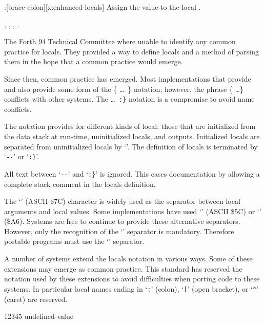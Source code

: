 \begin{worddef*}[b:]{}{\brace:}[brace-colon][x:enhanced-locals]
	Assign the value  to the local .

\see {},
	,
	,
	.

	\begin{rationale}
		The Forth 94 Technical Committee where unable to identify any common
		practice for locals.  They provided a way to define locals and a method
		of parsing them in the hope that a common practice would emerge.

		Since then, common practice has emerged.  Most implementations that
		provide  and \linebreak {} also provide some form of the
		\{ \ldots\ \} notation; however, the phrase \{ \ldots \} conflicts with
		other systems.  The  \ldots\ \texttt{:\}} notation is a compromise
		to avoid name conflicts.

		The notation provides for different kinds of local: those  that are
		initialized from the data stack at run-time, uninitialized locals, and
		outputs.  Initialized locals are separated from uninitialized locals by
		`\texttt{\textbar}'.  The definition of locals is terminated by
		`\texttt{-{}-}' or `\texttt{:\}}'.

		All text between `\texttt{-{}-}' and `\texttt{:\}}' is ignored.  This eases
		documentation by allowing a complete stack comment in the locals definition.

		The `\texttt{\textbar}' (ASCII \$7C) character is widely used as the
		separator between local arguments and local values.  Some implementations
		have used `\texttt{\bs}' (ASCII \$5C) or `\texttt{\textbrokenbar}' (\$A6).
		Systems are free to continue to provide these alternative separators.
		However, only the recognition of the `\texttt{\textbar}' separator is
		mandatory.  Therefore portable programs must use the `\texttt{\textbar}'
		separator.

		A number of systems extend the locals notation in various ways.  Some of
		these extensions may emerge as common practice.  This standard has reserved
		the notation used by these extensions to avoid difficulties when porting
		code to these systems.  In particular local names ending in
		`\texttt{:}' (colon),
		`\texttt{[}' (open bracket), or
		`\texttt{\textasciicircum}' (caret) are reserved.
	\end{rationale}

	\begin{implement}
12345  undefined-value


\end{implement}
\end{worddef*}
